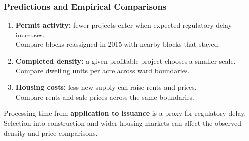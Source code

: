 \begin{frame}
    \frametitle{Predictions and Empirical Comparisons}
    \begin{enumerate}[itemsep=0.7em]
      \item \textbf{Permit activity:} fewer projects enter when expected regulatory delay increases.\\
        {\small Compare blocks reassigned in 2015 with nearby blocks that stayed.}
      \item \textbf{Completed density:} a given profitable project chooses a smaller scale.\\
        {\small Compare dwelling units per acre across ward boundaries.}
      \item \textbf{Housing costs:} less new supply can raise rents and prices.\\
        {\small Compare rents and sale prices across the same boundaries.}
    \end{enumerate}
    \vspace{0.5em}
    \small Processing time from \textbf{application to issuance} is a proxy for regulatory delay. Selection into construction and wider housing markets can affect the observed density and price comparisons.
\end{frame}
